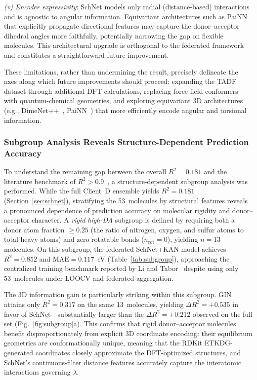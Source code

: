 \documentclass[twocolumn]{article}
\newcommand{\lam}{\lambda}
\newcommand{\Rsq}{R^{2}}
\begin{document}
\emph{(v) Encoder expressivity}: SchNet models only radial (distance-based) interactions and is agnostic to angular information.
Equivariant architectures such as PaiNN~\cite{Schutt2021_PaiNN} that explicitly propagate directional features may capture the donor--acceptor dihedral angles more faithfully, potentially narrowing the gap on flexible molecules.
This architectural upgrade is orthogonal to the federated framework and constitutes a straightforward future improvement.

These limitations, rather than undermining the result, precisely delineate the axes along which future improvements should proceed: expanding the TADF dataset through additional DFT calculations, replacing force-field conformers with quantum-chemical geometries, and exploring equivariant 3D architectures (e.g., DimeNet++~\cite{Gasteiger2020_DimeNet}, PaiNN~\cite{Schutt2021_PaiNN}) that more efficiently encode angular and torsional information.

\subsubsection{Subgroup Analysis Reveals Structure-Dependent Prediction Accuracy}\label{sec:subgroup}

To understand the remaining gap between the overall $\Rsq = 0.181$ and the literature benchmark of $\Rsq > 0.9$~\cite{Li2023_SchNet}, a structure-dependent subgroup analysis was performed.
While the full Client~D ensemble yields $\Rsq = 0.181$ (Section~\ref{sec:schnet}), stratifying the 53~molecules by structural features reveals a pronounced dependence of prediction accuracy on molecular rigidity and donor--acceptor character.
A \emph{rigid high-DA} subgroup is defined by requiring both a donor atom fraction $\geq 0.25$ (the ratio of nitrogen, oxygen, and sulfur atoms to total heavy atoms) and zero rotatable bonds ($n_{\text{rot}} = 0$), yielding $n = 13$ molecules.
On this subgroup, the federated SchNet+KAN model achieves $\Rsq = 0.852$ and $\text{MAE} = 0.117$~eV (Table~\ref{tab:subgroup}), approaching the centralized training benchmark reported by Li and Tabor~\cite{Li2023_SchNet} despite using only 53~molecules under LOOCV and federated aggregation.

The 3D information gain is particularly striking within this subgroup.
GIN attains only $\Rsq = 0.317$ on the same 13~molecules, yielding $\Delta \Rsq = +0.535$ in favor of SchNet---substantially larger than the $\Delta \Rsq = +0.212$ observed on the full set (Fig.~\ref{fig:subgroup}a).
This confirms that rigid donor--acceptor molecules benefit disproportionately from explicit 3D coordinate encoding: their equilibrium geometries are conformationally unique, meaning that the RDKit ETKDG-generated coordinates closely approximate the DFT-optimized structures, and SchNet's continuous-filter distance features accurately capture the interatomic interactions governing $\lam$.
\end{document}
